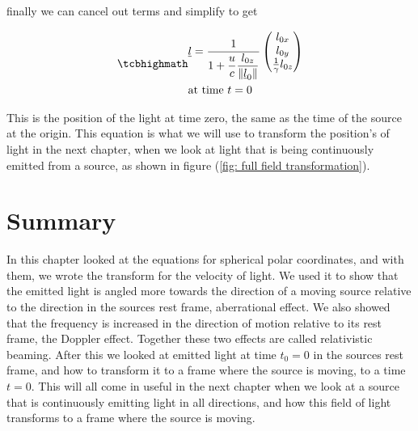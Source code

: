 

finally we can cancel out terms and simplify to get

\begin{equation}
	\label{eq: time synced transform}
	\mhl{
		\begin{aligned}
			 & \underline{l} =
			\dfrac{1}{ 1 + \dfrac{u}{c} \dfrac{l_{0z}}{\|\underline{l}_0\|} }
			\begin{pmatrix}
				l_{0x}                    \\
				l_{0y}                    \\
				\frac{1}{{\gamma}} l_{0z} \\
			\end{pmatrix}
			\\
			 & \text{at time ${t}=0$ }
		\end{aligned}
	}
\end{equation}

This is the position of the light at time zero, the same as the time of the source at the origin. This equation is what we will use to transform the position's of light in the next chapter, when we look at light that is being continuously emitted from a source, as shown in figure (\ref{fig: full field transformation}).

\section{Summary}\label{sect: Summary chapter 4}

In this chapter looked at the equations for spherical polar coordinates, and with them, we wrote the transform for the velocity of light.
We used it to show that the emitted light is angled more towards the direction of a moving source relative to the direction in the sources rest frame, aberrational effect.
We also showed that the frequency is increased in the direction of motion relative to its rest frame, the Doppler effect.
Together these two effects are called relativistic beaming.
After this we looked at emitted light at time $t_0=0$ in the sources rest frame, and how to transform it to a frame where the source is moving, to a time $t=0$.
This will all come in useful in the next chapter when we look at a source that is continuously emitting light in all directions, and how this field of light transforms to a frame where the source is moving.



